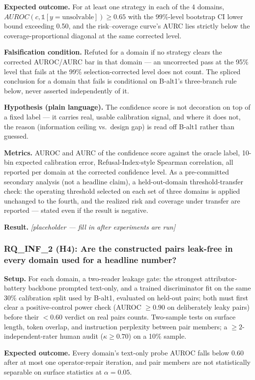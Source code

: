 \documentclass[11pt]{article}
\newcommand{\ph}{\textit{[placeholder --- fill in after experiments are run]}}
\begin{document}
\textbf{Expected outcome.} For at least one strategy in each of the 4 domains, $AUROC(c, \mathbb{1}[y=\text{unsolvable}]) \geq 0.65$ with the 99\%-level bootstrap CI lower bound exceeding 0.50, and the risk--coverage curve's AURC lies strictly below the coverage-proportional diagonal at the same corrected level.

\textbf{Falsification condition.} Refuted for a domain if no strategy clears the corrected AUROC/AURC bar in that domain --- an uncorrected pass at the 95\% level that fails at the 99\% selection-corrected level does not count. The spliced conclusion for a domain that fails is conditional on B-alt1's three-branch rule below, never asserted independently of it.

\textbf{Hypothesis (plain language).} The confidence score is not decoration on top of a fixed label --- it carries real, usable calibration signal, and where it does not, the reason (information ceiling vs.\ design gap) is read off B-alt1 rather than guessed.

\textbf{Metrics.} AUROC and AURC of the confidence score against the oracle label, 10-bin expected calibration error, Refusal-Index-style Spearman correlation, all reported per domain at the corrected confidence level. As a pre-committed secondary analysis (not a headline claim), a held-out-domain threshold-transfer check: the operating threshold selected on each set of three domains is applied unchanged to the fourth, and the realized risk and coverage under transfer are reported --- stated even if the result is negative.

\textbf{Result.} \ph

\subsubsection{RQ\_INF\_2 (H4): Are the constructed pairs leak-free in every domain used for a headline number?}
\textbf{Setup.} For each domain, a two-reader leakage gate: the strongest attributor-battery backbone prompted text-only, and a trained discriminator fit on the same 30\% calibration split used by B-alt1, evaluated on held-out pairs; both must first clear a positive-control power check (AUROC $\geq 0.90$ on deliberately leaky pairs) before their $<0.60$ verdict on real pairs counts. Two-sample tests on surface length, token overlap, and instruction perplexity between pair members; a $\geq 2$-independent-rater human audit ($\kappa \geq 0.70$) on a 10\% sample.

\textbf{Expected outcome.} Every domain's text-only probe AUROC falls below 0.60 after at most one operator-repair iteration, and pair members are not statistically separable on surface statistics at $\alpha=0.05$.
\end{document}
